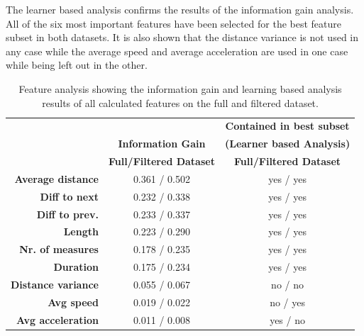 The learner based analysis confirms the results of the information gain analysis. All of the six most important features have been selected for the best feature subset in both datasets. It is also shown that the distance variance is not used in any case while the average speed and average acceleration are used in one case while being left out in the other.



\begin{table}


\centering
\bgroup
\def\arraystretch{1.4}
\begin{tabular}{| r || c | c |}
\hline
   & 
   \textbf{} & 
   \textbf{Contained in best subset} \\
   & 
   \textbf{Information Gain} & 
   \textbf{(Learner based Analysis)} \\
   & 
   \textbf{Full/Filtered Dataset} & 
   \textbf{Full/Filtered Dataset} \\
\hline
  \textbf{Average distance} & 
   0.361 / 0.502 &
   yes / yes \\
\hline
\textbf{Diff to next} & 
   0.232 / 0.338 &
   yes / yes \\
\hline
\textbf{Diff to prev.} & 
   0.233 / 0.337 &
   yes / yes \\
\hline
\textbf{Length} & 
   0.223 / 0.290 &
   yes / yes \\
\hline
\textbf{Nr. of measures} & 
   0.178 / 0.235 &
   yes / yes \\
\hline
\textbf{Duration} & 
   0.175 / 0.234 &
   yes / yes \\
\hline
\textbf{Distance variance} & 
   0.055 / 0.067 &
   no / no \\
\hline
\textbf{Avg speed} & 
   0.019 / 0.022 &
   no / yes \\
\hline
\textbf{Avg acceleration} & 
   0.011 / 0.008 &
   yes / no \\
\hline


\end{tabular}
\egroup

\caption{Feature analysis showing the information gain and learning based analysis results of all calculated features on the full and filtered dataset.}
\label{table:feature_analysis}
\end{table}















